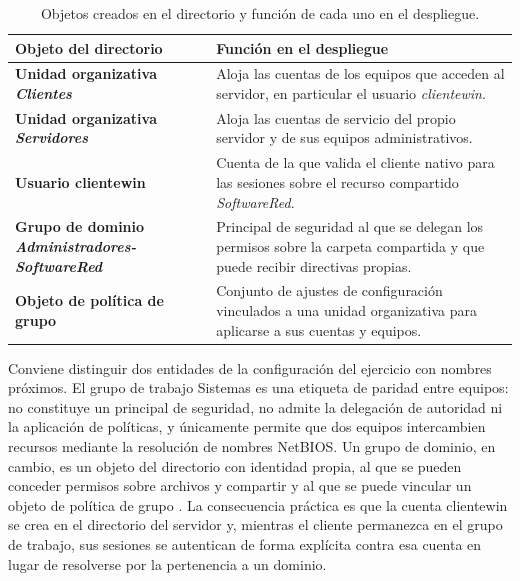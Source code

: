 \documentclass[12pt]{article}
\begin{document}
\begin{table}[H]
\centering
\small
\renewcommand{\arraystretch}{1.15}
\renewcommand{\tabularxcolumn}[1]{m{#1}}
\setlength{\emergencystretch}{1.5em}
\caption{Objetos creados en el directorio y función de cada uno en el despliegue.}
\label{tab:objetosDirectorio}
\begin{tabularx}{\textwidth}{>{\centering\arraybackslash}m{4.2cm} X}
\toprule
\textbf{Objeto del directorio} & \textbf{Función en el despliegue} \\
\midrule
\textbf{Unidad organizativa \textit{Clientes}} & Aloja las cuentas de los equipos que acceden al servidor, en particular el usuario \textit{clientewin}. \\
\addlinespace
\textbf{Unidad organizativa \textit{Servidores}} & Aloja las cuentas de servicio del propio servidor y de sus equipos administrativos. \\
\addlinespace
\textbf{Usuario clientewin} & Cuenta de la que valida el cliente nativo para las sesiones sobre el recurso compartido \textit{SoftwareRed}. \\
\addlinespace
\textbf{Grupo de dominio \textit{Administradores-SoftwareRed}} & Principal de seguridad al que se delegan los permisos sobre la carpeta compartida y que puede recibir directivas propias. \\
\addlinespace
\textbf{Objeto de política de grupo} & Conjunto de ajustes de configuración vinculados a una unidad organizativa para aplicarse a sus cuentas y equipos. \\
\bottomrule
\end{tabularx}
\end{table}

Conviene distinguir dos entidades de la configuración del ejercicio con nombres próximos. El grupo de trabajo Sistemas es una etiqueta de paridad entre equipos: no constituye un principal de seguridad, no admite la delegación de autoridad ni la aplicación de políticas, y únicamente permite que dos equipos intercambien recursos mediante la resolución de nombres NetBIOS. Un grupo de dominio, en cambio, es un objeto del directorio con identidad propia, al que se pueden conceder permisos sobre archivos y compartir y al que se puede vincular un objeto de política de grupo \parencite{microsoftADDSOverview}. La consecuencia práctica es que la cuenta clientewin se crea en el directorio del servidor y, mientras el cliente permanezca en el grupo de trabajo, sus sesiones se autentican de forma explícita contra esa cuenta en lugar de resolverse por la pertenencia a un dominio.
\end{document}
